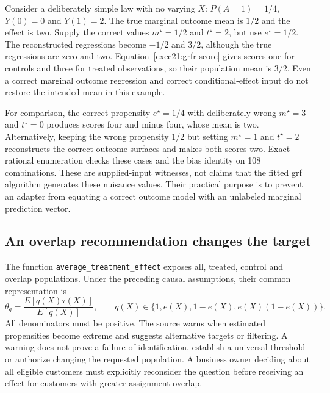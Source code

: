 Consider a deliberately simple law with no varying $X$: $P(A=1)=1/4$, $Y(0)=0$ and $Y(1)=2$. The true marginal outcome mean is $1/2$ and the effect is two. Supply the correct values $m^\star=1/2$ and $t^\star=2$, but use $e^\star=1/2$. The reconstructed regressions become $-1/2$ and $3/2$, although the true regressions are zero and two. Equation~\eqref{exec21:grfr-score} gives scores one for controls and three for treated observations, so their population mean is $3/2$. Even a correct marginal outcome regression and correct conditional-effect input do not restore the intended mean in this example.

For comparison, the correct propensity $e^\star=1/4$ with deliberately wrong $m^\star=3$ and $t^\star=0$ produces scores four and minus four, whose mean is two. Alternatively, keeping the wrong propensity $1/2$ but setting $m^\star=1$ and $t^\star=2$ reconstructs the correct outcome surfaces and makes both scores two. Exact rational enumeration checks these cases and the bias identity on 108 combinations. These are supplied-input witnesses, not claims that the fitted grf algorithm generates these nuisance values. Their practical purpose is to prevent an adapter from equating a correct outcome model with an unlabeled marginal prediction vector.~\citep{exec21_grf_reference}

\subsection{An overlap recommendation changes the target}
\label{exec21:grfr-target}
The function \texttt{average\_treatment\_effect} exposes all, treated, control and overlap populations. Under the preceding causal assumptions, their common representation is
\begin{equation}
 \theta_q=\frac{E[q(X)\tau(X)]}{E[q(X)]},\qquad
 q(X)\in\{1,e(X),1-e(X),e(X)(1-e(X))\}.
 \label{exec21:grfr-populations}
\end{equation}
All denominators must be positive. The source warns when estimated propensities become extreme and suggests alternative targets or filtering. A warning does not prove a failure of identification, establish a universal threshold or authorize changing the requested population. A business owner deciding about all eligible customers must explicitly reconsider the question before receiving an effect for customers with greater assignment overlap.~\citep{exec21_grf_reuse}


